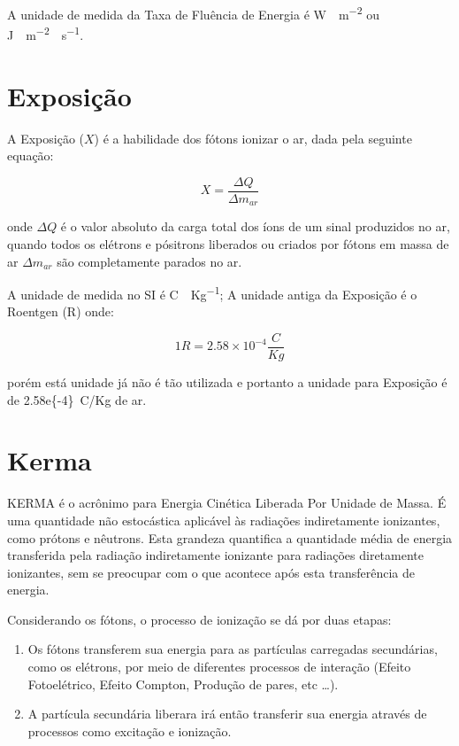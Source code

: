 \documentclass[11pt,a4paper]{article}
\newcounter{exemplo}
\begin{document}
		\begin{exemplo}[Unidade]
			A unidade de medida da Taxa de Fluência de Energia é \unit{W \cdot m^{-2}} ou \unit{J \cdot m^{-2} \cdot s^{-1}}.
		\end{exemplo}
		
		
	\section{Exposição}

		A Exposição ($X$) é a habilidade dos fótons ionizar o ar, dada pela seguinte equação:

			\begin{equation}
				X = \frac{\Delta Q}{\Delta m_{ar}}
			\end{equation}

		\noindent onde $\Delta Q$ é o valor absoluto da carga total dos íons de um sinal produzidos no ar, quando todos os elétrons e pósitrons liberados ou criados por fótons em  massa de ar $\Delta m_{ar}$ são completamente parados no ar.
		
		
		\begin{exemplo}[Unidade]
			A unidade de medida no SI é \unit{C \cdot Kg^{-1}}; A unidade antiga da Exposição é o Roentgen (R) onde:

			\begin{equation*}
				1 R = 2.58 \times 10 ^{-4}\frac{C}{Kg}
			\end{equation*}

		\noindent porém está unidade já não é tão utilizada e portanto a unidade para Exposição é de \qty{2.58e{-4}}{C/Kg} de ar.
		\end{exemplo}
		

	\section{Kerma}

		KERMA é o acrônimo para Energia Cinética Liberada Por Unidade de Massa. É uma quantidade não estocástica aplicável às radiações indiretamente ionizantes, como prótons e nêutrons. Esta grandeza quantifica a quantidade média de energia transferida pela radiação indiretamente ionizante para radiações diretamente ionizantes, sem se preocupar com o que acontece após esta transferência de energia. 

		Considerando os fótons, o processo de ionização se dá por duas etapas: 

			\begin{enumerate}
				\item Os fótons transferem sua energia para as partículas carregadas secundárias, como os elétrons, por meio de diferentes processos de interação (Efeito Fotoelétrico, Efeito Compton, Produção de pares, etc \dots).
				
				\item A partícula secundária liberara irá então transferir sua energia através de processos como excitação e ionização. 
			\end{enumerate}
\end{document}

